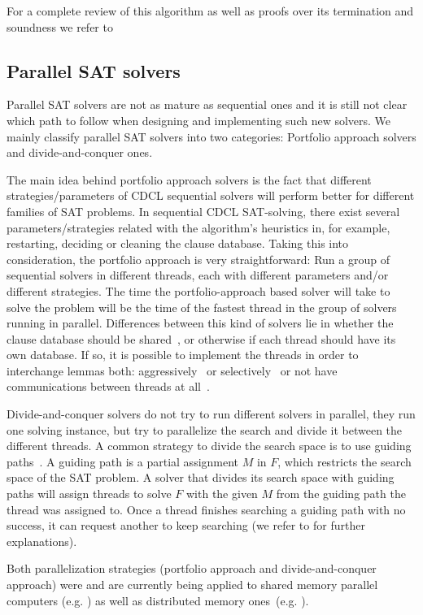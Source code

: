 \documentclass{llncs}
\begin{document}
For a complete review of this algorithm as well as proofs over its
termination and soundness we refer to \cite{Nieuwenhuisetal2006JACM}


\subsection{Parallel SAT solvers}
Parallel SAT solvers are not as mature 
as sequential ones and it is still not clear which path to follow
when designing and implementing such new solvers.  
We mainly classify parallel SAT solvers into two categories: 
Portfolio approach solvers and divide-and-conquer ones.

The main idea behind portfolio approach solvers is the fact that different 
strategies/parameters of CDCL sequential solvers will perform better 
for different families of SAT problems. 
In sequential CDCL SAT-solving, there exist several parameters/strategies 
related with the algorithm's heuristics in, for example, restarting, deciding 
or cleaning the clause database. Taking this into 
consideration, the portfolio approach is very straightforward: 
Run a group of sequential solvers in different threads, 
each with different parameters
 and/or different strategies. The time the portfolio-approach based 
solver will take to solve the problem will be the time of the fastest 
thread in the group of solvers running in parallel. 
Differences between this kind of solvers lie in whether the clause
database should be shared~\cite{Sartagnan}, or otherwise if each thread should 
have its own database. If so, it is possible to implement the threads in order to
interchange lemmas both: aggressively~\cite{ManySAT} or selectively~\cite{plingeling} or 
not have communications between threads at all~\cite{ppfolio}.

Divide-and-conquer solvers do not try to run different solvers in parallel, 
they run one solving instance, but try to parallelize the search and divide it 
between the different threads. A common strategy to divide the search space is 
to use guiding paths~\cite{psato}. A guiding path is a partial assignment $M$ in $F$, 
which restricts the search space of the SAT problem. A solver that divides 
its search space with guiding paths will assign threads to solve $F$ with the 
given $M$ from the guiding path the thread was assigned to. Once a thread 
finishes searching a guiding path with no success, it can request another to 
keep searching (we refer to \cite{paMiraXT} for further explanations). 

Both parallelization strategies (portfolio approach and divide-and-conquer approach) 
were and are currently being applied 
to shared memory parallel computers (e.g. \cite{plingeling}) as well as distributed 
memory ones~(e.g. \cite{paMiraXT}). 
\end{document}
